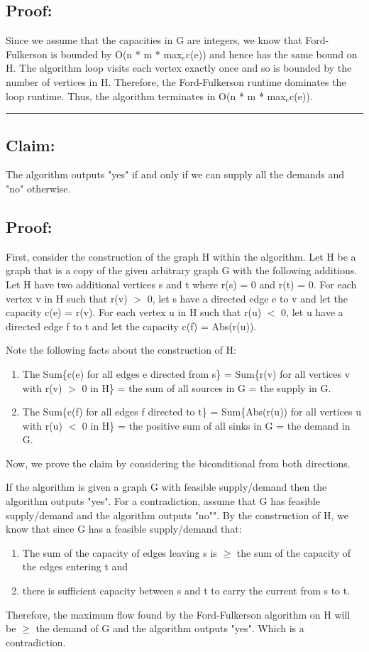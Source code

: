 \documentclass[11pt]{article}
\begin{document}
\subsection*{Proof:}

Since we assume that the capacities in G are integers, we know that Ford-Fulkerson is bounded by O(n * m * max$_e$c(e)) and hence has the same bound on H. The algorithm loop visits each vertex exactly once and so is bounded by the number of vertices in H. Therefore, the Ford-Fulkerson runtime dominates the loop runtime. Thus, the algorithm terminates in O(n * m * max$_e$c(e)).

\noindent\textcolor[RGB]{220,220,220}{\rule{\linewidth}{0.8pt}}

\subsection*{Claim:}

The algorithm outputs "yes" if and only if we can supply all the demands and "no" otherwise. 

\subsection*{Proof:}
First, consider the construction of the graph H within the algorithm. Let H be a graph that is a copy of the given arbitrary graph G with the following additions. Let H have two additional vertices s and t where r(s) = 0 and r(t) = 0. For each vertex v in H such that r(v) $>$ 0, let s have a directed edge e to v and let the capacity c(e) = r(v). For each vertex u in H such that r(u) $<$ 0, let u have a directed edge f to t and let the capacity c(f) = Abs(r(u)). 

Note the following facts about the construction of H:
\begin{enumerate}
\item The Sum\{c(e) for all edges e directed from s\} = Sum\{r(v) for all vertices v with r(v) $>$ 0 in H\} = the sum of all sources in G = the supply in G.
\item The Sum\{c(f) for all edges f directed to t\} = Sum\{Abs(r(u)) for all vertices u with r(u) $<$ 0 in H\} = the positive sum of all sinks in G = the demand in G. 
\end{enumerate}

Now, we prove the claim by considering the biconditional from both directions. 

If the algorithm is given a graph G with feasible supply/demand then the algorithm outputs "yes".
For a contradiction, assume that G has feasible supply/demand and the algorithm outputs "no"". 
By the construction of H, we know that since G has a feasible supply/demand that:
\begin{enumerate}
\item The sum of the capacity of edges leaving s is $\geq$ the sum of the capacity of the edges entering t and 
\item there is sufficient capacity between s and t to carry the current from s to t.
\end{enumerate}
Therefore, the maximum flow found by the Ford-Fulkerson algorithm on H will be $\geq$ the demand of G and the algorithm outputs "yes". Which is a contradiction. 
\end{document}
